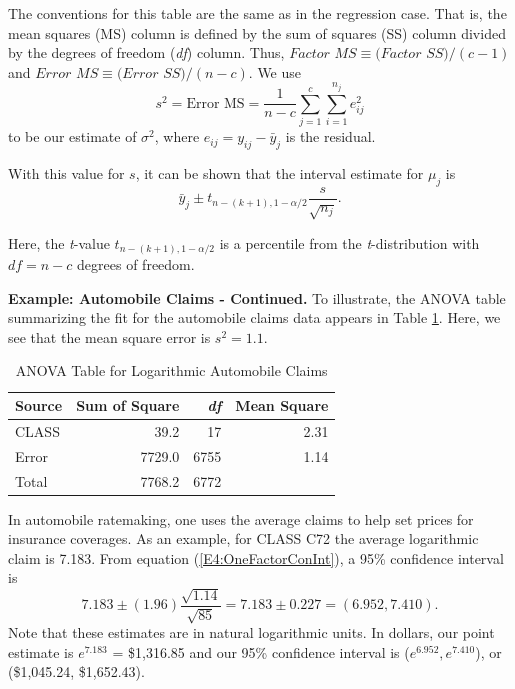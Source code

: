 \noindent The conventions for this table are the same as in the
regression case. That is, the mean squares (MS) column is defined by
the sum of squares (SS) column divided by the degrees of freedom
(\textit{df}) column. Thus, $Factor$ $MS\equiv (Factor$ $SS)/(c-1)$
and $Error$ $MS\equiv (Error$ $SS)/(n-c)$. We use
\begin{equation*}
s^2=\text{Error MS}=\frac{1}{n-c} \sum_{j=1}^{c}\sum_{i=1}^{n_j}
e_{ij}^2
\end{equation*}
to be our estimate of $\sigma^2$, where $e_{ij}=y_{ij}-\bar{y}_j$ is
the residual.

With this value for $s$, it can be shown that the interval estimate
for $\mu_j$ is
\begin{equation}\label{E4:OneFactorConInt}
\bar{y}_j \pm t_{n-(k+1),1-\alpha /2}\frac{s}{\sqrt{n_j}}.
\end{equation}

\noindent Here, the \textit{t}-value $t_{n-(k+1),1-\alpha /2}$ is a percentile from the
\textit{t}-distribution with $df=n-c$ degrees of freedom.

\linejed

\textbf{Example: Automobile Claims - Continued.} To illustrate, the ANOVA table summarizing
the fit for the automobile claims data appears in Table \ref{T4:ANOVAAuto}. Here, we see that the
mean square error is $s^2 = 1.1.$

\begin{table}[h]
\caption{\label{T4:ANOVAAuto} ANOVA Table for Logarithmic Automobile
Claims}
\begin{tabular}{lrrr}
\hline Source & Sum of Square & \textit{df} & Mean Square \\
\hline
CLASS & 39.2 & 17 & 2.31\\
Error  & 7729.0 & 6755& 1.14\\
Total  & 7768.2  & 6772 & \\
\hline
\end{tabular}
\end{table}

In automobile ratemaking, one uses the average claims to help set
prices for insurance coverages. As an example, for CLASS C72 the
average logarithmic claim is 7.183. From equation
(\ref{E4:OneFactorConInt}), a 95\% confidence interval is
\begin{equation*}
7.183 \pm (1.96) \frac{\sqrt{1.14}}{\sqrt{85}} = 7.183 \pm 0.227 =
(6.952 ,7.410).\end{equation*} Note that these estimates are in
natural logarithmic units. In dollars, our point estimate is
$e^{7.183}$ = \$1,316.85 and our 95\% confidence interval is
($e^{6.952} ,e^{7.410}$), or (\$1,045.24, \$1,652.43).

